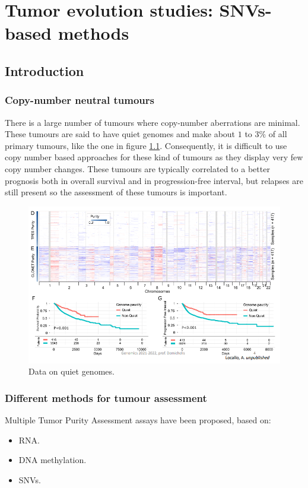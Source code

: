 \graphicspath{{chapters/notes/07/images/}}

\chapter{Tumor evolution studies: SNVs-based methods}

\section{Introduction}

    \subsection{Copy-number neutral tumours}
    There is a large number of tumours where copy-number aberrations are minimal.
    These tumours are said to have quiet genomes and make about $1$ to $3\%$ of all primary tumours, like the one in figure \ref{fig:quiet}.
    Consequently, it is difficult to use copy number based approaches for these kind of tumours as they display very few copy number changes.
    These tumours are typically correlated to a better prognosis both in overall survival and in progression-free interval, but relapses are still present so the assessment of these tumours is important.

    \begin{figure}[H]
    \centering
        \includegraphics[width=0.7\linewidth]{quiet_genome.png}
        \caption{Data on quiet genomes.}
        \label{fig:quiet}
    \end{figure}

    \subsection{Different methods for tumour assessment}
    Multiple Tumor Purity Assessment assays have been proposed, based on:
    \begin{multicols}{3}
        \begin{itemize}
            \item RNA.
            \item DNA methylation.
            \item SNVs.
        \end{itemize}
    \end{multicols}

